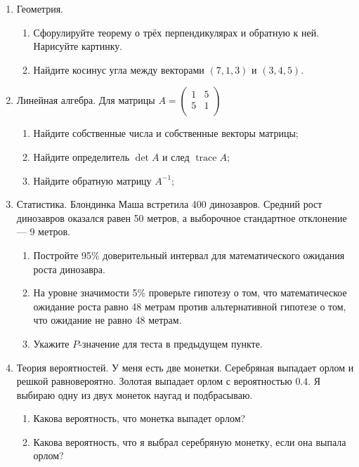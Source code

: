 \documentclass[12pt]{article}
\DeclareMathOperator{\tr}{trace}
\begin{document}
\newpage

\begin{enumerate}

  \item Геометрия.
  \begin{enumerate}
    \item Сфорулируйте теорему о трёх перпендикулярах и обратную к ней. Нарисуйте картинку.
    \item Найдите косинус угла между векторами $(7, 1, 3)$ и $(3, 4, 5)$.
  \end{enumerate}
  

  \item Линейная алгебра. Для матрицы
$
  A=\begin{pmatrix}
  1 & 5  \\
  5 & 1  \\
  \end{pmatrix}
$

  \begin{enumerate}
  \item Найдите собственные числа и собственные векторы матрицы;
  \item Найдите определитель $\det A$ и след $\tr A$;
 \item Найдите обратную матрицу $A^{-1}$;
  \end{enumerate}


  \item Статистика. Блондинка Маша встретила 400 динозавров.
  Средний рост динозавров оказался равен 50 метров, а выборочное стандартное отклонение — 9 метров.

  \begin{enumerate}
    \item Постройте 95\% доверительный интервал для математического ожидания роста динозавра.
    \item На уровне значимости 5\% проверьте гипотезу о том, что математическое ожидание
    роста равно 48 метрам против альтернативной гипотезе о том, что ожидание не равно 48 метрам.
    \item Укажите $P$-значение для теста в предыдущем пункте.
  \end{enumerate}

 \item Теория вероятностей. У меня есть две монетки. Серебряная выпадает орлом и решкой равновероятно.
 Золотая выпадает орлом с вероятностью $0.4$. 
 Я выбираю одну из двух монеток наугад и подбрасываю.
 \begin{enumerate}
   \item Какова вероятность, что монетка выпадет орлом?
   \item Какова вероятность, что я выбрал серебряную монетку, если она выпала орлом?
 \end{enumerate}

\end{enumerate}
\end{document}
